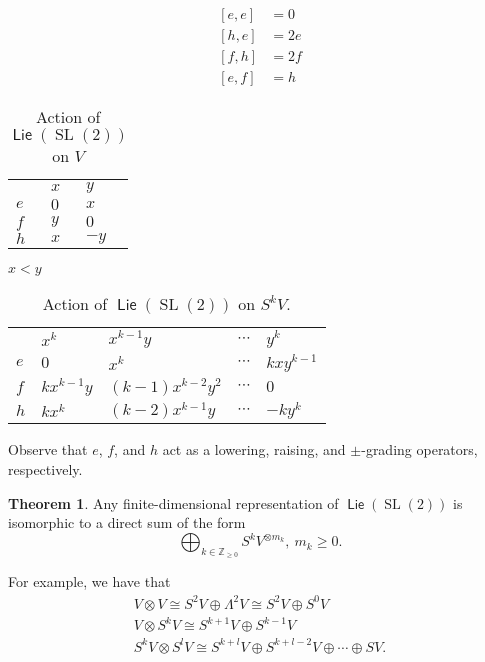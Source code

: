 \documentclass[10pt,letterpaper,cm]{nupset}
\theoremstyle{definition}
\theoremstyle{theorem}
\newtheorem{theorem}[defn]{Theorem}
\theoremstyle{remark}
\newcommand{\Z}{\mathbb Z}
\newcommand{\1}{\mathbb{1}}
\newcommand{\0}{\vec 0}
\DeclareMathOperator{\SL}{SL}
\DeclareMathOperator{\lie}{\mathsf{Lie}}
\begin{document}
\begin{align*}
\left[e,e\right] &=0
\\ \left[h,e\right] & = 2e
\\ \left[f,h\right] & = 2f
\\ \left[e,f\right] &= h
\end{align*}


\begin{table}[H]
\centering
\begin{tabular}{lll}
 & $x$ & $y$ \\ \cline{2-3} 
\multicolumn{1}{l|}{$e$} & $0$ & $x$ \\
\multicolumn{1}{l|}{$f$} & $y$ & $0$ \\
\multicolumn{1}{l|}{$h$} & $x$ & ${-y}$
\end{tabular}  \quad \quad $x<y$
\caption{Action of $\lie(\SL(2))$ on ${V}$}
\end{table}

\begin{table}[H]
\centering
\begin{tabular}{lllll}
                         & $x^k$        & $x^{k-1}y$ & $\cdots$ & $y^k$         \\ \cline{2-5} 
\multicolumn{1}{l|}{$e$} & $0$          & $x^k$      & $\cdots$ & $k{xy^{k-1}}$ \\
\multicolumn{1}{l|}{$f$} & $kx^{k-1}{y}$ & $\left(k-1\right)x^{k-2}y^2$          & $\cdots$ & $0$            \\
\multicolumn{1}{l|}{$h$} & $kx^k$       & $\left(k-2\right){x^{k-1}y}$         & $\cdots$ & ${-k}y^k$    
\end{tabular}
\caption{Action of $\lie(\SL(2))$ on $S^k{V}$.}
\label{tab:my-table}
\end{table}

Observe that $e$, $f$, and $h$ act as a lowering, raising, and $\pm$-grading operators, respectively. 

\begin{theorem}
Any finite-dimensional representation of $\lie(\SL(2))$ is isomorphic to a direct sum of the form
\[
\bigoplus_{k\in \Z_{\geq 0}}S^k{V}^{\otimes{m_k}}, \ m_k\geq 0
.\]
\end{theorem}

For example, we have that
\begin{gather*}
V \otimes V \cong S^2{V} \oplus \Lambda^2{V} \cong S^2{V} \oplus S^0{V}
\\ V \otimes S^k{V} \cong S^{k+1}{V} \oplus S^{k-1}{V} 
\\ S^k{V} \otimes S^l{V} \cong S^{k+l}{V} \oplus S^{k+l-2}{V} \oplus \cdots \oplus S{V}
.
\end{gather*}
\end{document}
